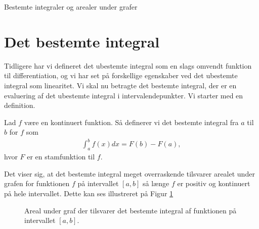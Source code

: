 \begin{center}
\Huge
Bestemte integraler og arealer under grafer
\end{center}

\section*{Det bestemte integral}
Tidligere har vi defineret det ubestemte integral som en slags omvendt funktion til differentiation, og vi har set på forskellige egenskaber ved det ubestemte integral som linearitet. Vi skal nu betragte det bestemte integral, der er en evaluering af det ubestemte integral i intervalendepunkter. Vi starter med en definition.
\begin{defn}
Lad $f$ være en kontinuert funktion. Så definerer vi det bestemte integral fra $a$ til $b$ for $f$ som
\begin{align*}
\int_a^bf(x) dx = F(b)-F(a),
\end{align*}
hvor $F$ er en stamfunktion til $f$. 
\end{defn}
Det viser sig, at det bestemte integral meget overraskende tilsvarer arealet under grafen for funktionen $f$ på intervallet $[a,b]$ så længe $f$ er positiv og kontinuert på hele intervallet. Dette kan ses illustreret på 
Figur \ref{fig:areal}
\begin{figure}[H]
	\centering
	\caption{Areal under graf der tilsvarer det bestemte integral af funktionen på intervallet $[a,b]$.}
	\label{fig:areal}
\end{figure}
